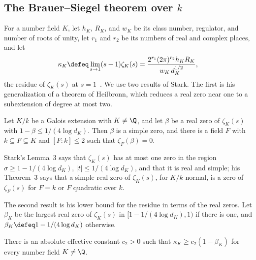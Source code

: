 \documentclass[11pt, reqno, twoside, letterpaper]{amsart}
\newcommand{\Kf}{K}
\begin{document}
\subsection{The Brauer--Siegel theorem over $k$}

For a number field $\Kf$, let $h_\Kf$, $R_\Kf$, and $w_\Kf$ be
its class number, regulator, and number of roots of unity, let $r_1$
and $r_2$ be its numbers of real and complex places, and let
\[
\kappa_\Kf\defeq\lim_{s\to 1}(s-1)\zeta_\Kf(s)
=\frac{2^{r_1}(2\pi)^{r_2}h_\Kf R_\Kf}{w_\Kf\,d_\Kf^{1/2}},
\]
the residue of $\zeta_\Kf(s)$ at $s=1$~\cite[Chapter~VII,
Corollary~(5.11)]{Ne}. We use two results of Stark. The first is
his generalization of a theorem of Heilbronn, which reduces a real
zero near one to a subextension of degree at most two.

\begin{lemma}
\label{lem:stark}
Let $\Kf/k$ be a Galois extension with $\Kf\ne\Q$, and let $\beta$ be
a real zero of $\zeta_\Kf(s)$ with $1-\beta\le 1/(4\log d_\Kf)$. Then
$\beta$ is a simple zero, and there is a field $F$ with
$k\subseteq F\subseteq\Kf$ and $[F:k]\le 2$ such that
$\zeta_F(\beta)=0$.
\end{lemma}

Stark's Lemma~3 says that $\zeta_\Kf(s)$ has at most one zero in
the region $\sigma\ge 1-1/(4\log d_\Kf)$,
$|t|\le 1/(4\log d_\Kf)$, and that it is real and simple; his
Theorem~3 says that a simple real zero of $\zeta_\Kf(s)$, for
$\Kf/k$ normal, is a zero of $\zeta_F(s)$ for $F=k$ or $F$ quadratic
over $k$.

The second result is his lower bound for the residue in terms of the
real zeros. Let $\beta_\Kf$ be the largest real zero of
$\zeta_\Kf(s)$ in $[1-1/(4\log d_\Kf),1)$ if there is one, and
$\beta_\Kf\defeq 1-1/(4\log d_\Kf)$ otherwise.

\begin{lemma}\label{lem:residue}
There is an absolute effective constant $c_2>0$ such that
$\kappa_\Kf\ge c_2(1-\beta_\Kf)$ for every number field $\Kf\ne\Q$.
\end{lemma}

\medskip
\end{document}
